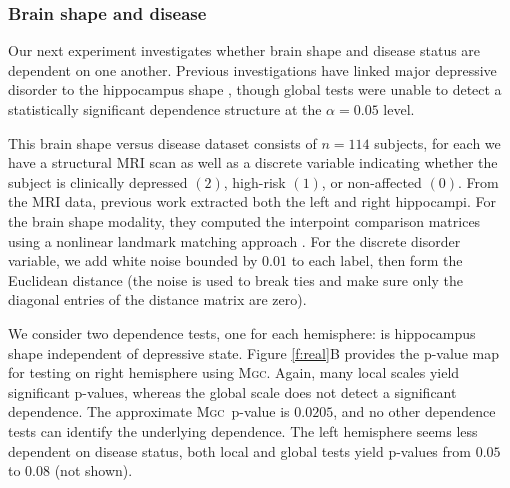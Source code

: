 \documentclass[11pt]{article}
\newcommand{\note}[2][]{\added[#1,remark={#2}]{}}
\providecommand{\sct}[1]{{\normalfont\textsc{#1}}}
\newcommand{\Mgc}{\sct{Mgc}}
\newcommand{\Hhg}{\sct{Hhg}}
\newcommand{\Dcorr}{\sct{Dcorr}}
\newcommand{\Mcorr}{\sct{Mcorr}}
\newcommand{\Mantel}{\sct{Mantel}}
\newcommand{\jv}[1]{{\note{jv: #1}}}
\begin{document}
\subsubsection*{Brain shape and disease} %


Our next experiment investigates whether brain shape and disease status are dependent on one another.  Previous investigations have linked major depressive disorder to the hippocampus shape \cite{ParkEtAl2008,PosenerEtAl2003}, though global tests were unable to detect a statistically significant dependence structure at the $\alpha=0.05$ level.



This brain shape versus disease dataset consists of $n=114$ subjects, for each we have a structural MRI scan as well as a discrete variable indicating whether the subject is clinically depressed $(2)$, high-risk $(1)$, or non-affected $(0)$.  From the MRI data, previous work  extracted both the left and right hippocampi.   For the brain shape modality, they computed the interpoint comparison matrices using a nonlinear landmark matching approach \cite{ParkEtAl2008,BegEtAl2005}. For the discrete disorder variable, we add white noise bounded by $0.01$ to each label, then form the Euclidean distance (the noise is used to break ties and make sure only the diagonal entries of the distance matrix are zero).

We consider two dependence tests, one for each hemisphere: is hippocampus shape independent of depressive state.
Figure \ref{f:real}B provides the p-value map for testing on right hemisphere using \Mgc. Again, many local scales yield significant p-values, whereas the global scale does not detect a significant dependence. The approximate \Mgc~p-value is $0.0205$, and no other dependence tests can identify the underlying  dependence. The left hemisphere seems less dependent on disease status, 
both local and global tests yield  p-values from $0.05$ to $0.08$ (not shown). 
\jv{let's check whether anybody knew that?}
\end{document}
